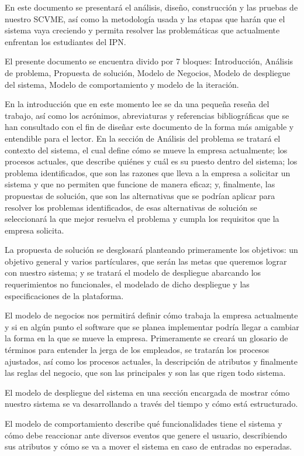 En este documento se presentará el análisis, diseño, construcción y las pruebas de nuestro SCVME, así como la metodología usada y las etapas que harán que el sistema vaya creciendo y permita resolver las problemáticas que actualmente enfrentan los estudiantes del IPN.
	
El presente documento se encuentra divido por 7 bloques: Introducción, Análisis de problema, Propuesta de solución, Modelo de Negocios, Modelo de despliegue del sistema, Modelo de comportamiento y modelo de la iteración.

En la introducción que en este momento lee se da una pequeña reseña del trabajo, así como los acrónimos, abreviaturas y referencias bibliográficas que se han consultado con el fin de diseñar este documento de la forma más amigable y entendible para el lector.
En la sección de Análisis del problema se tratará el contexto del sistema, el cual define cómo se mueve la empresa actualmente; los procesos actuales, que describe quiénes y cuál es su puesto dentro del sistema; los problema identificados, que son las razones que lleva a la empresa a solicitar un sistema y que no permiten que funcione de manera eficaz; y, finalmente, las propuestas de solución, que son las alternativas que se podrían aplicar para resolver los problemas identificados, de esas alternativas de solución se seleccionará la que mejor resuelva el problema y cumpla los requisitos que la empresa solicita.

La propuesta de solución se desglosará planteando primeramente los objetivos: un objetivo general y varios partículares, que serán las metas que queremos lograr con nuestro sistema; y se tratará el modelo de despliegue abarcando los requerimientos no funcionales, el modelado de dicho despliegue y las especificaciones de la plataforma.

El modelo de negocios nos permitirá definir cómo trabaja la empresa actualmente y si en algún punto el software que se planea implementar podría llegar a cambiar la forma en la que se mueve la empresa. Primeramente se creará un glosario de términos para entender la jerga de los empleados, se tratarán los procesos ajustados, así como los procesos actuales, la descripción de atributos y finalmente las reglas del negocio, que son las principales y son las que rigen todo sistema.

El modelo de despliegue del sistema en una sección encargada de mostrar cómo nuestro sistema se va desarrollando a través del tiempo y cómo está estructurado.

El modelo de comportamiento describe qué funcionalidades tiene el sistema y cómo debe reaccionar ante diversos eventos que genere el usuario, describiendo sus atributos y cómo se va a mover el sistema en caso de entradas no esperadas.

